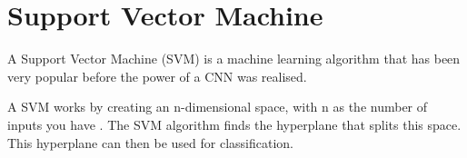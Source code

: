 \section{Support Vector Machine}
A Support Vector Machine (SVM) is a machine learning algorithm that has been
very popular before the power of a CNN was realised.

A SVM works by creating an n-dimensional space, with n as the number of
inputs you have \textcite{svm}. The SVM algorithm finds the hyperplane that splits this space.
This hyperplane can then be used for classification.